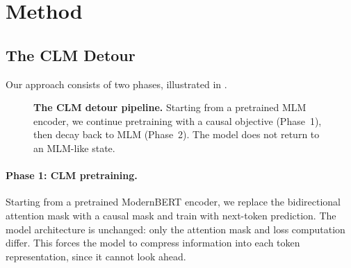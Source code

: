 \section{Method}
\label{sec:clm-detour}

\subsection{The CLM Detour}

\begin{reviewread}
Our approach consists of two phases, illustrated in .
\end{reviewread}

\begin{figure}[t]
\centering
{}
\caption{\textbf{The CLM detour pipeline.} Starting from a pretrained MLM encoder, we continue pretraining with a causal objective (Phase~1), then decay back to MLM (Phase~2). The model does not return to an MLM-like state.}
\label{fig:clm-pipeline}
\end{figure}

\paragraph{Phase 1: CLM pretraining.} Starting from a pretrained ModernBERT encoder, we replace the bidirectional attention mask with a causal mask and train with next-token prediction. The model architecture is unchanged: only the attention mask and loss computation differ. This forces the model to compress information into each token representation, since it cannot look ahead.

